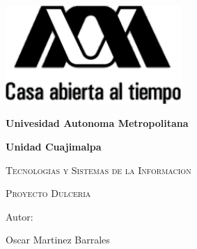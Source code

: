 \documentclass{report}
\begin{document}
    \begin{titlepage}
        \centering
        {\includegraphics[width=0.5\textwidth]{imagenes/logo.png}\par}
        \vspace{1cm}
        {\bfseries\LARGE Univesidad Autonoma Metropolitana\par}
        \vspace{1cm}
        {\bfseries\large Unidad Cuajimalpa\par}  
        \vspace{1cm}
        {\scshape\Large Tecnologias y Sistemas de la Informacion \par}
        \vspace{2cm}
        {\scshape\Huge Proyecto Dulceria \par}
        \vspace{2cm}
        {\Large Autor: \par}
        {\Large Oscar Martinez Barrales \par}
        \vfill 
    \end{titlepage}

\newpage

\newpage

\newpage

\end{document}

